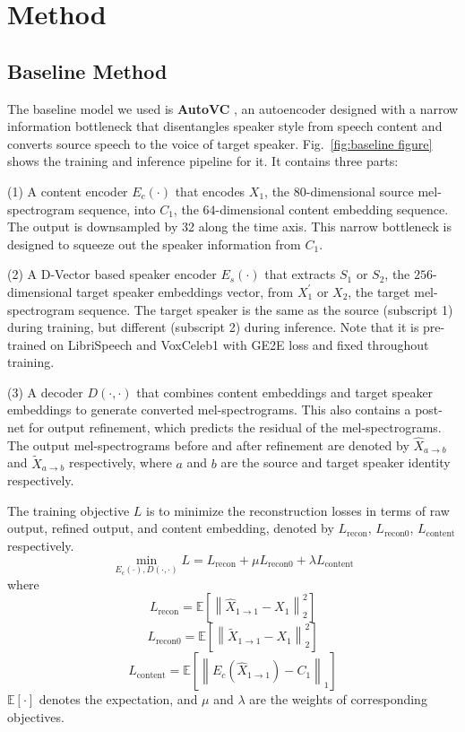 \documentclass[a4paper]{article}
\begin{document}
\section{Method}
\label{Method}
\subsection{Baseline Method}
    The baseline model we used is \textbf{AutoVC} \cite{qian2019autovc}, an autoencoder designed with a narrow information bottleneck that disentangles speaker style from speech content and converts source speech to the voice of target speaker. Fig.~\ref{fig:baseline figure} shows the training and inference pipeline for it. It contains three parts:
    
    (1) A content encoder $E_c(\cdot)$ that encodes $X_1$, the $80$-dimensional source mel-spectrogram sequence, into $C_1$, the $64$-dimensional content embedding sequence. The output is downsampled by 32 along the time axis. This narrow bottleneck is designed to squeeze out the speaker information from $C_1$. 
    
    (2) A D-Vector \cite{variani2014deep} based speaker encoder $E_s(\cdot)$ that extracts $S_1$ or $S_2$, the $256$-dimensional target speaker embeddings vector, from $X_1^{\prime}$ or $X_2$, the target mel-spectrogram sequence. The target speaker is the same as the source (subscript 1) during training, but different (subscript 2) during inference. Note that it is pre-trained on LibriSpeech \cite{panayotov2015librispeech} and VoxCeleb1 \cite{nagrani2020voxceleb} with GE2E loss \cite{speakerencoder} and fixed throughout training.
    
    (3) A decoder $D(\cdot,\cdot)$ that combines content embeddings and target speaker embeddings to generate converted mel-spectrograms. This also contains a post-net for output refinement, which predicts the residual of the mel-spectrograms. The output mel-spectrograms before and after refinement are denoted by $\hat{X}_{a\rightarrow b}$ and $\tilde{X}_{a\rightarrow b}$ respectively, where $a$ and $b$ are the source and target speaker identity respectively.

    The training objective $L$ is to minimize the reconstruction losses in terms of raw output, refined output, and content embedding, denoted by $L_{\text{recon}}$, $L_{\text{recon0}}$, $L_{\text{content}}$ respectively.
    \[\min_{E_c(\cdot),D(\cdot,\cdot)} L = L_{\text{recon}} + \mu L_{\text{recon0}} + \lambda L_{\text{content}}\]
    where
    \[L_{\text{recon}} = \mathbb{E}\left[\left\|\hat{X}_{1\rightarrow 1} - X_1\right\|^2_2\right] \]
    \[L_{\text{recon0}} = \mathbb{E}\left[\left\|\tilde{X}_{1\rightarrow 1} - X_1\right\|^2_2\right]\]
    \[L_{\text{content}} = \mathbb{E}\left[\left\|E_c(\hat{X}_{1\rightarrow 1}) - C_1\right\|_1\right]\]
    $\mathbb{E}[\cdot]$ denotes the expectation, and $\mu$ and $\lambda$ are the weights of corresponding objectives.
    
\end{document}

